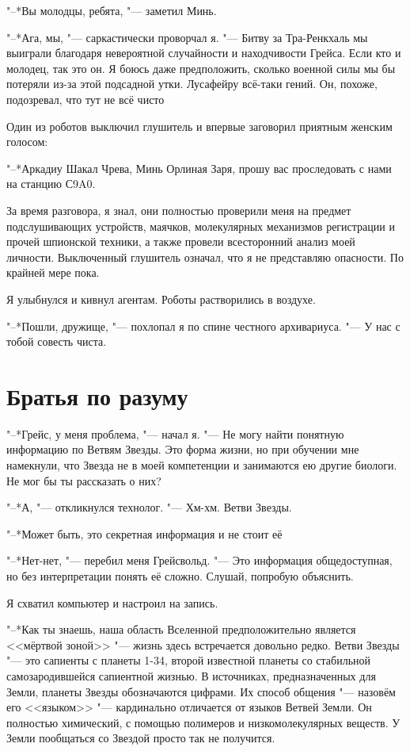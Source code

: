 \documentclass[a4paper,10pt,fleqn]{book}
\newcommand{\ldotst}{\so{...}\xspace}
\newcommand{\ldotsq}{\so{?\hbox{\hspace{-.212em}}..}\xspace}
\begin{document}
"--*Вы молодцы, ребята, "--- заметил Минь.

"--*Ага, мы, "--- саркастически проворчал я.
"--- Битву за Тра-Ренкхаль мы выиграли благодаря невероятной случайности и находчивости Грейса.
Если кто и молодец, так это он.
Я боюсь даже предположить, сколько военной силы мы бы потеряли из-за этой подсадной утки.
Лусафейру всё-таки гений.
Он, похоже, подозревал, что тут не всё чисто\ldotst

Один из роботов выключил глушитель и впервые заговорил приятным женским голосом:

"--*Аркадиу Шакал Чрева, Минь Орлиная Заря, прошу вас проследовать с нами на станцию С9A0.

За время разговора, я знал, они полностью проверили меня на предмет подслушивающих устройств, маячков, молекулярных механизмов регистрации и прочей шпионской техники, а также провели всесторонний анализ моей личности.
Выключенный глушитель означал, что я не представляю опасности.
По крайней мере пока.

Я улыбнулся и кивнул агентам.
Роботы растворились в воздухе.

"--*Пошли, дружище, "--- похлопал я по спине честного архивариуса.
"--- У нас с тобой совесть чиста.

\section{Братья по разуму}

"--*Грейс, у меня проблема, "--- начал я.
"--- Не могу найти понятную информацию по Ветвям Звезды.
Это форма жизни, но при обучении мне намекнули, что Звезда не в моей компетенции и занимаются ею другие биологи.
Не мог бы ты рассказать о них?

"--*А, "--- откликнулся технолог.
"--- Хм-хм.
Ветви Звезды.

"--*Может быть, это секретная информация и не стоит её\ldotsq

"--*Нет-нет, "--- перебил меня Грейсвольд.
"--- Это информация общедоступная, но без интерпретации понять её сложно.
Слушай, попробую объяснить.

Я схватил компьютер и настроил на запись.

"--*Как ты знаешь, наша область Вселенной предположительно является <<мёртвой зоной>> "--- жизнь здесь встречается довольно редко.
Ветви Звезды "--- это сапиенты с планеты 1-34, второй известной планеты со стабильной самозародившейся сапиентной жизнью.
В источниках, предназначенных для Земли, планеты Звезды обозначаются цифрами.
Их способ общения "--- назовём его <<языком>> "--- кардинально отличается от языков Ветвей Земли.
Он полностью химический, с помощью полимеров и низкомолекулярных веществ.
У Земли пообщаться со Звездой просто так не получится.
\end{document}
